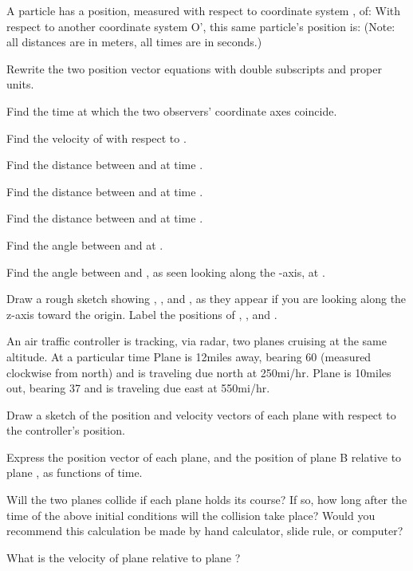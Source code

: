 {\begin{one-digit-list}
\item [3.] A particle  has a position, measured with respect to coordinate
system , of:
%
%
With respect to another coordinate system O', this same particle's position
is:
%
%
(Note: all distances are in meters, all times are in seconds.)
\begin{one-digit-list}
\item [a.] Rewrite the two position vector equations with double subscripts and
proper units.
\item [b.] Find the time at which the two observers' coordinate axes coincide.
\item [c.] Find the velocity of  with respect to . 
\item [d.] Find the distance between  and  at time .
\item [e.] Find the distance between  and  at time .
\item [f.] Find the distance between  and  at time .
\item [g.] Find the angle between  and  at
.
\item [h.] Find the angle between  and , as seen
looking along the -axis, at .
\item [i.] Draw a rough sketch showing , ,
and , as they appear if you are looking along the z-axis toward
the origin.
Label the positions of , , and .
\end{one-digit-list}

\item [4.] An air traffic controller is tracking, via radar, two planes
cruising at the same altitude.
At a particular time Plane  is 12\unit{miles} away, bearing {60\degrees} (measured
clockwise from north) and is traveling due north at 250\unit{mi/hr}.
Plane  is 10\unit{miles} out, bearing {37\degrees} and is traveling due east at
550\unit{mi/hr}.
\begin{one-digit-list}
\item [a.] Draw a sketch of the position and velocity vectors of each plane
with respect to the controller's position.
\item [b.] Express the position vector of each plane, and the position of plane B
relative to plane , as functions of time.
\item [c.] Will the two planes collide if each plane holds its course?
If so, how long after the time of the above initial conditions will the
collision take place?
Would you recommend this calculation be made by hand calculator, slide rule,
or computer?
\item [d.] What is the velocity of plane  relative to plane ?
\end{one-digit-list}


\end{one-digit-list}}
